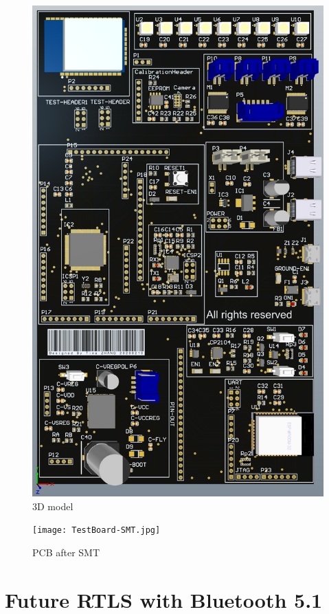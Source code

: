 \documentclass[sigconf]{acmart}
\begin{document}
\begin{figure}[h]
  \centering
  \includegraphics[width=\linewidth]{3DModel.png}
  \caption{3D model}
  \label{fig:3Dmodel}
\end{figure}

\begin{figure}[h]
  \centering
  \texttt{[image: TestBoard-SMT.jpg]}
  \caption{PCB after SMT}
  \label{fig:PCBSMT}
\end{figure}

\section{Future RTLS with Bluetooth 5.1}
\end{document}
